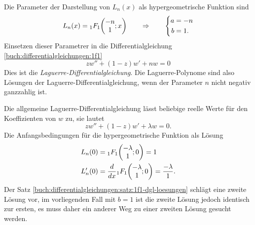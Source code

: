 Die Parameter der Darstellung von $L_n(x)$ als hypergeometrische
Funktion sind
\[
L_n(x) = \mathstrut_1F_1\biggl(
\begin{matrix}-n\\1\end{matrix}
;x
\biggr)
\qquad\Rightarrow\qquad
\left\{
\begin{aligned}
a&=-n\\
b&=1.
\end{aligned}
\right.
\]
Einsetzen dieser Parametrer in die Differentialgleichung
\eqref{buch:differentialgleichungen:1f1}
\begin{equation}
zw'' + (1-z)w'+nw=0
\label{buch:differentialgleichungen:eqn:laguerre-dgl}
\end{equation}
Dies ist die {\em Laguerre-Differentialgleichung}.
%
%
Die Laguerre-Polynome sind also Lösungen der Laguerre-Differentialgleichung,
wenn der Parameter $n$ nicht negativ ganzzahlig ist.

Die allgemeine Laguerre-Differentialgleichung lässt beliebige reelle
Werte für den Koeffizienten von $w$ zu, sie lautet
\[
zw''+(1-z)w'+\lambda w=0.
\]
Die Anfangsbedingungen für die hypergeometrische Funktion als Lösung 
\begin{align*}
L_n(0)
&=
\mathstrut_1F_1\biggl(\begin{matrix}-\lambda\\1\end{matrix}; 0\biggr) = 1
\\
L'_n(0) &=
\frac{d}{dx}
\mathstrut_1F_1\biggl(\begin{matrix}-\lambda\\1\end{matrix};0\biggr)
=
\frac{-\lambda}{1}.
\end{align*}
Der Satz
\ref{buch:differentialgleichungen:satz:1f1-dgl-loesungen}
schlägt eine zweite Lösung vor, im vorliegenden Fall mit $b=1$
ist die zweite Lösung jedoch identisch zur ersten, es muss daher
ein anderer Weg zu einer zweiten Lösung gesucht werden.


%
%
%
